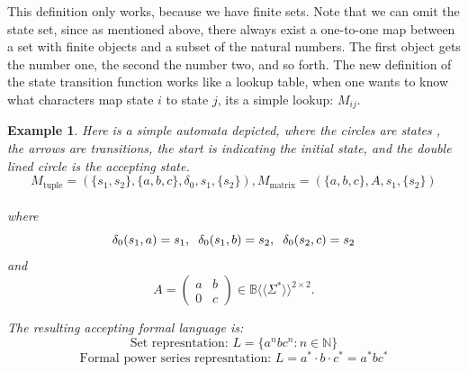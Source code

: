 \documentclass[12pt,letterpaper]{article}
\newtheorem{example}{Example}[section]
\newcommand{\fps}[1] {
\mathbb{#1}\langle \langle \Sigma^* \rangle \rangle
}
\begin{document}
This definition only works, because we have finite sets. Note that we can omit
the state set, since as mentioned above, there always exist a one-to-one map
between a set with finite objects and a subset of the natural numbers. The first
object gets the number one, the second the number two, and so forth. The new
definition of the state transition function works like a lookup table, when one
wants to know what characters map state $i$ to state $j$, its a simple lookup:
$M_{ij}$.

\begin{example}
  Here is a simple automata depicted, where the circles are states
  , the arrows are transitions, the start is indicating the initial 
  state, and the double lined circle is the accepting state.
  \[ 
    M_\text{tuple} = (\{s_1, s_2\}, \{a,b,c\}, \delta_0, s_1, \{s_2\}),
    M_\text{matrix} = (\{a,b,c\}, A, s_1, \{ s_2 \})
  \]\\
  where
  \[
    \delta_0(s_1, a) = s_1, \hspace{0.2cm} 
    \delta_0(s_1, b) = s_2, \hspace{0.2cm} \delta_0(s_2,c) = s_2
  \]
  and
  \[ 
    A = 
    \begin{pmatrix}
      a & b \\
      0 & c 
    \end{pmatrix} \in \fps{B}^{2\times 2}.
  \]
  \begin{center}
  \end{center}
  The resulting accepting formal language is:
  \[ \text{Set represntation: } L = \{a^nbc^n : n \in \mathbb{N}\}\]
  \[
    \text{Formal power series represntation: } L = a^*\cdot b\cdot c^* 
  = a^*bc^*
\]
\end{example}
\end{document}
